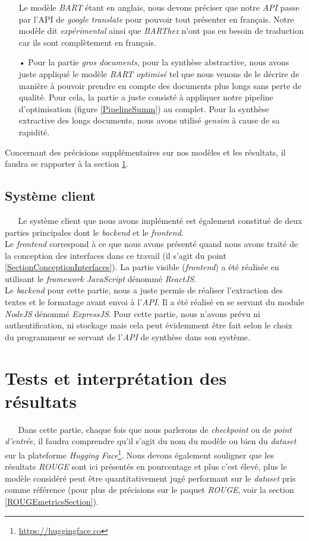 \begin{itemize}
Le modèle \textit{BART} étant en anglais, nous devons préciser que notre \textit{API} passe par l'API de \textit{google translate} pour pouvoir tout présenter en français. Notre modèle dit \textit{expérimental} ainsi que \textit{BARThez} n'ont pas eu besoin de traduction car ils sont complètement en français. 
\item[•] Pour la partie \textit{gros documents}, pour la synthèse abstractive, nous avons juste appliqué le modèle \textit{BART optimisé} tel que nous venons de le décrire de manière à pouvoir prendre en compte des documents plus longs sans perte de qualité. Pour cela, la partie a juste consisté à appliquer notre pipeline d'optimisation (figure \ref{PipelineSumm}) au complet. Pour la synthèse extractive des longs documents, nous avons utilisé \textit{gensim} à cause de sa rapidité.
\end{itemize}
Concernant des précisions supplémentaires sur nos modèles et les résultats, il faudra se rapporter à la section \ref{sectioTestEtResultats}.
\subsection{Système client}
$ _{} $ $ _{} $ $ _{} $ $ _{} $ $ _{} $Le système client que nous avons implémenté est également constitué de deux parties principales dont le \textit{backend} et le \textit{frontend}.\\
Le \textit{frontend} correspond à ce que nous avons présenté quand nous avons traité de la con\-ce\-ption des interfaces dans ce travail (il s'agit du point \ref{SectionConceptionInterfaces}). La partie visible (\textit{frontend}) a été réalisée en utilisant le \textit{framework} \textit{JavaScript} dénommé \textit{ReactJS}.\\
Le \textit{backend} pour cette partie, nous a juste permis de réaliser l'extraction des textes et le formatage avant envoi à l'\textit{API}. Il a été réalisé en se servant du module \textit{NodeJS} dénommé \textit{ExpressJS}. Pour cette partie, nous n'avons prévu ni authentification, ni stockage mais cela peut évidemment être fait selon le choix du programmeur se servant de l'\textit{API} de synthèse dans son système.

\section{Tests et interprétation des résultats}\label{sectioTestEtResultats}
$ _{} $ $ _{} $ $ _{} $ $ _{} $ $ _{} $Dans cette partie, chaque fois que nous parlerons de \textit{checkpoint} ou de \textit{point d'entrée}, il faudra comprendre qu'il s'agit du nom du modèle ou bien du \textit{dataset} sur la plateforme \textit{Hugging Face}\footnote{\href{https://huggingface.co}{https://huggingface.co}}. Nous devons également souligner que les résultats \textit{ROUGE} sont ici présentés en pourcentage et plus c'est élevé, plus le modèle considéré peut être quan\-ti\-ta\-ti\-ve\-ment jugé performant sur le \textit{dataset} pris comme référence (pour plus de précisions sur le paquet \textit{ROUGE}, voir la section \ref{ROUGEmetricsSection}).
